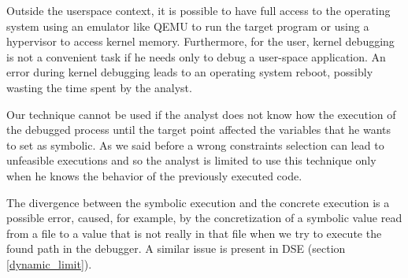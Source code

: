 Outside the userspace context, it is possible to have full access to the operating system using an emulator like QEMU \cite{qemu} to run the target program or using a hypervisor to access kernel memory.
Furthermore, for the user, kernel debugging is not a convenient task if he needs only to debug a user-space application. An error during kernel debugging leads to an operating system reboot, possibly wasting the time spent by the analyst.

Our technique cannot be used if the analyst does not know how the execution of the debugged process until the target point affected the variables that he wants to set as symbolic. As we said before a wrong constraints selection can lead to unfeasible executions and so the analyst is limited to use this technique only when he knows the behavior of the previously executed code.

The divergence between the symbolic execution and the concrete execution is a possible error, caused, for example, by the concretization of a symbolic value read from a file to a value that is not really in that file when we try to execute the found path in the debugger. A similar issue is present in DSE (section \ref{dynamic_limit}).
